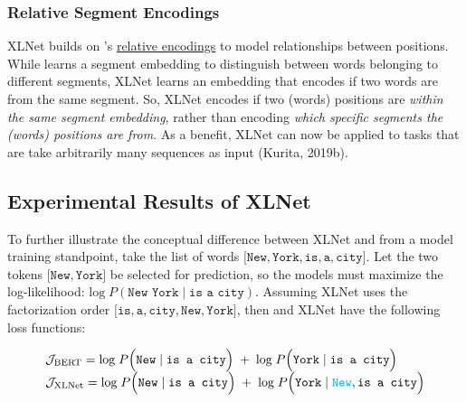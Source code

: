 

\subsubsection{Relative Segment Encodings}\label{sec:RelativeSegmentEncodings}

XLNet builds on 's \hyperref[sec:RelativePosEnc]{relative encodings} to model relationships between positions. While  learns a segment embedding to distinguish between words belonging to different segments, XLNet learns an embedding that encodes if two words are from the same segment. So, XLNet encodes if two (words) positions are \emph{within the same segment embedding}, rather than encoding \emph{which specific segments the (words) positions are from}. As a benefit, XLNet can now be applied to tasks that are take arbitrarily many sequences as input (Kurita, 2019b). 


\subsection{Experimental Results of XLNet}

To further illustrate the conceptual difference between XLNet and  from a model training standpoint, take the list of words $\Big[ \texttt{New}, \texttt{York}, \texttt{is}, \texttt{a}, \texttt{city} \Big]$. Let the two tokens $\Big[ \texttt{New}, \texttt{York} \Big]$ be selected for prediction, so the models must maximize the log-likelihood: $\text{log} \; P(\texttt{New York} \; | \; \texttt{is a city})$. Assuming XLNet uses the factorization order $\Big[ \texttt{is}, \texttt{a}, \texttt{city}, \texttt{New}, \texttt{York} \Big]$, then  and XLNet have the following loss functions: 

\begin{equation}
\begin{array}{ll}
\mathcal{J}_\text{BERT} = \text{log} \; P \Big( \texttt{New} \; | \; \texttt{is a city} \Big) \; + \; \text{log} \; P \Big( \texttt{York} \; | \; \texttt{is a city} \Big) \\
\mathcal{J}_\text{XLNet} = \text{log} \; P \Big( \texttt{New} \; | \; \texttt{is a city} \Big) \; + \; \text{log} \; P \Big( \texttt{York} \; | \; {\color{cyan} \texttt{New}}, \texttt{is a city} \Big) 
\end{array}
\end{equation}


